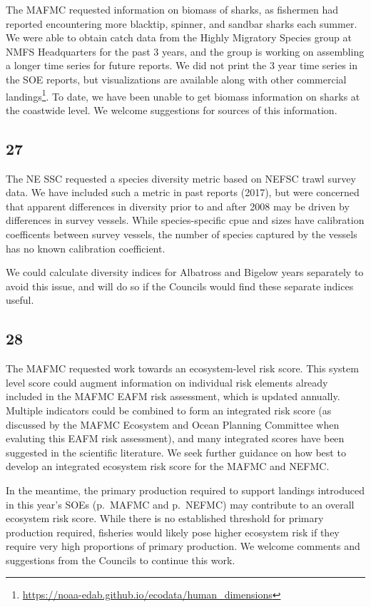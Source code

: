 \documentclass[
  10pt,
]{article}
\begin{document}
The MAFMC requested information on biomass of sharks, as fishermen had
reported encountering more blacktip, spinner, and sandbar sharks each
summer. We were able to obtain catch data from the Highly Migratory
Species group at NMFS Headquarters for the past 3 years, and the group
is working on assembling a longer time series for future reports. We did
not print the 3 year time series in the SOE reports, but visualizations
are available along with other commercial landings\footnote{\url{https://noaa-edab.github.io/ecodata/human_dimensions}}.
To date, we have been unable to get biomass information on sharks at the
coastwide level. We welcome suggestions for sources of this information.

\hypertarget{section-26}{%
\subsection{27}\label{section-26}}

The NE SSC requested a species diversity metric based on NEFSC trawl
survey data. We have included such a metric in past reports (2017), but
were concerned that apparent differences in diversity prior to and after
2008 may be driven by differences in survey vessels. While
species-specific cpue and sizes have calibration coefficents between
survey vessels, the number of species captured by the vessels has no
known calibration coefficient.

We could calculate diversity indices for Albatross and Bigelow years
separately to avoid this issue, and will do so if the Councils would
find these separate indices useful.

\hypertarget{section-27}{%
\subsection{28}\label{section-27}}

The MAFMC requested work towards an ecosystem-level risk score. This
system level score could augment information on individual risk elements
already included in the MAFMC EAFM risk assessment, which is updated
annually. Multiple indicators could be combined to form an integrated
risk score (as discussed by the MAFMC Ecosystem and Ocean Planning
Committee when evaluting this EAFM risk assessment), and many integrated
scores have been suggested in the scientific literature. We seek further
guidance on how best to develop an integrated ecosystem risk score for
the MAFMC and NEFMC.

In the meantime, the primary production required to support landings
introduced in this year's SOEs (p.~MAFMC and p.~NEFMC) may contribute to
an overall ecosystem risk score. While there is no established threshold
for primary production required, fisheries would likely pose higher
ecosystem risk if they require very high proportions of primary
production. We welcome comments and suggestions from the Councils to
continue this work.
\end{document}
